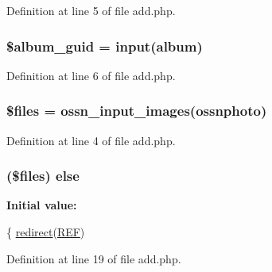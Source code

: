 Definition at line 5 of file add.\+php.

\subsubsection[{\texorpdfstring{\$album\+\_\+guid}{$album_guid}}]{\setlength{\rightskip}{0pt plus 5cm}\$album\+\_\+guid = {\bf input}(\textquotesingle{}album\textquotesingle{})}\hypertarget{components_2_ossn_photos_2actions_2photos_2add_8php_a864e7d5465efc979134e4ca9a950483c}{}\label{components_2_ossn_photos_2actions_2photos_2add_8php_a864e7d5465efc979134e4ca9a950483c}


Definition at line 6 of file add.\+php.

\subsubsection[{\texorpdfstring{\$files}{$files}}]{\setlength{\rightskip}{0pt plus 5cm}\$files = {\bf ossn\+\_\+input\+\_\+images}(\textquotesingle{}ossnphoto\textquotesingle{})}\hypertarget{components_2_ossn_photos_2actions_2photos_2add_8php_a9590b15215a21e9b42eb546aeef79704}{}\label{components_2_ossn_photos_2actions_2photos_2add_8php_a9590b15215a21e9b42eb546aeef79704}


Definition at line 4 of file add.\+php.

\subsubsection[{\texorpdfstring{else}{else}}]{ (\$files) else}\hypertarget{components_2_ossn_photos_2actions_2photos_2add_8php_adb03f81370fdb163748eafde54988853}{}\label{components_2_ossn_photos_2actions_2photos_2add_8php_adb03f81370fdb163748eafde54988853}
{\bfseries Initial value\+:}
\begin{DoxyCode}
\{
        \hyperlink{ossn_8lib_8system_8php_a33cafdb93398ec540993c12c1daa0c48}{redirect}(\hyperlink{ossn_8lib_8system_8php_a6141904c50990cdd468f07046f29bb5c}{REF})
\end{DoxyCode}


Definition at line 19 of file add.\+php.

